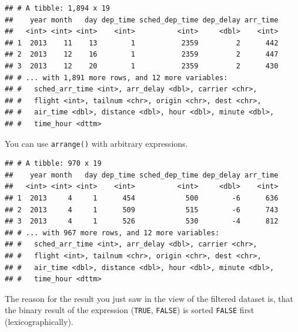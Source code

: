 \documentclass[]{book}
\newenvironment{Shaded}{}{}
\newcommand{\DecValTok}[1]{#1}
\newcommand{\KeywordTok}[1]{\textcolor[rgb]{0.00,0.00,1.00}{#1}}
\newcommand{\NormalTok}[1]{#1}
\newcommand{\OperatorTok}[1]{#1}
\newcommand{\StringTok}[1]{\textcolor[rgb]{0.00,0.50,0.50}{#1}}
\begin{document}
\begin{verbatim}
## # A tibble: 1,894 x 19
##    year month   day dep_time sched_dep_time dep_delay arr_time
##   <int> <int> <int>    <int>          <int>     <dbl>    <int>
## 1  2013    11    13        1           2359         2      442
## 2  2013    12    16        1           2359         2      447
## 3  2013    12    20        1           2359         2      430
## # ... with 1,891 more rows, and 12 more variables:
## #   sched_arr_time <int>, arr_delay <dbl>, carrier <chr>,
## #   flight <int>, tailnum <chr>, origin <chr>, dest <chr>,
## #   air_time <dbl>, distance <dbl>, hour <dbl>, minute <dbl>,
## #   time_hour <dttm>
\end{verbatim}

You can use \texttt{arrange()} with arbitrary expressions.

\begin{Shaded}
\end{Shaded}

\begin{verbatim}
## # A tibble: 970 x 19
##    year month   day dep_time sched_dep_time dep_delay arr_time
##   <int> <int> <int>    <int>          <int>     <dbl>    <int>
## 1  2013     4     1      454            500        -6      636
## 2  2013     4     1      509            515        -6      743
## 3  2013     4     1      526            530        -4      812
## # ... with 967 more rows, and 12 more variables:
## #   sched_arr_time <int>, arr_delay <dbl>, carrier <chr>,
## #   flight <int>, tailnum <chr>, origin <chr>, dest <chr>,
## #   air_time <dbl>, distance <dbl>, hour <dbl>, minute <dbl>,
## #   time_hour <dttm>
\end{verbatim}

The reason for the result you just saw in the view of the filtered dataset is, that the binary result of the expression (\texttt{TRUE}, \texttt{FALSE}) is sorted \texttt{FALSE} first (lexicographically).
\end{document}
